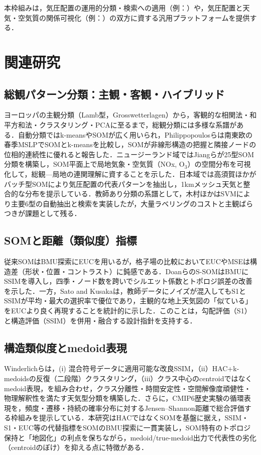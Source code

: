 \documentclass{jarticle}
\theoremstyle{definition}
\begin{document}
本枠組みは，気圧配置の運用的分類・検索への適用（例：\cite{木村広希2009サポートベクターマシンを用いた気圧配置検出手法の提案}）や，気圧配置と天気・空気質の関係可視化（例：\cite{jiang2013classification}）の双方に資する汎用プラットフォームを提供する．
\section{関連研究}
\subsection{総観パターン分類：主観・客観・ハイブリッド}
ヨーロッパの主観分類（Lamb型，Grosswetterlagen）から，客観的な相関法・和平方和法・クラスタリング・PCAに至るまで，総観分類には多様な系譜がある．自動分類ではk-meansやSOMが広く用いられ，Philippopoulosら\cite{philippopoulos2014performance}は南東欧の春季MSLPでSOMとk-meansを比較し，SOMが非線形構造の把握と隣接ノードの位相的連続性に優れると報告した．ニュージーランド域ではJiangら\cite{jiang2013classification}が25型SOM分類を構築し，SOM平面上で局地気象・空気質（NOx, O$_3$）の空間分布を可視化して，総観—局地の連関理解に資することを示した．日本域では高須賀ほか\cite{takasuka2024}がバッチ型SOMにより気圧配置の代表パターンを抽出し，1kmメッシュ天気と整合的な分布を提示している．教師あり分類の系譜として，木村ほか\cite{木村広希2009サポートベクターマシンを用いた気圧配置検出手法の提案}はSVMにより主要6型の自動抽出と検索を実装したが，大量ラベリングのコストと主観ばらつきが課題として残る．
\subsection{SOMと距離（類似度）指標}
従来SOMはBMU探索にEUCを用いるが，格子場の比較においてEUCやMSEは構造差（形状・位置・コントラスト）に鈍感である\cite{doan2021s}．DoanらのS-SOM\cite{doan2021s}はBMUにSSIMを導入し，四季・ノード数を跨いでシルエット係数とトポロジ誤差の改善を示した．一方，Sato and Kusaka\cite{SATOTakuto20212021-047}は，教師データにノイズが混入してもS1とSSIMが平均・最大の選択率で優位であり，主観的な地上天気図の「似ている」をEUCより良く再現することを統計的に示した．このことは，勾配評価（S1）と構造評価（SSIM）を併用・融合する設計指針を支持する．
\subsection{構造類似度とmedoid表現}
Winderlichら\cite{winderlich2024classification}は，(i) 混合符号データに適用可能な改良SSIM，（ii）HAC+k-medoidsの反復（二段階）クラスタリング，（iii）クラス中心のcentroidではなくmedoid表現，を組み合わせ，クラス分離性・時間安定性・空間解像度頑健性・物理解釈性を満たす天気型分類を構築した．さらに，CMIP6歴史実験の循環表現を，頻度・遷移・持続の確率分布に対するJensen–Shannon距離で総合評価する枠組みを提示している．本研究はHACではなくSOMを基盤に据え，SSIM・S1・EUC等の代替指標をSOMのBMU探索に一貫実装し，SOM特有のトポロジ保持と「地図化」の利点を保ちながら，medoid/true-medoid出力で代表性の劣化（centroidのぼけ）を抑える点に特徴がある．
\end{document}
